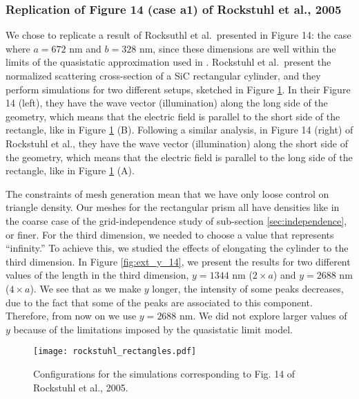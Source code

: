 \subsubsection{Replication of Figure 14 (case a1) of Rockstuhl et al., 2005}

We chose to replicate a result of Rocksuthl et al.\ presented in Figure 14: 
the case where $a=672$ nm 
and $b=328$ nm, since these dimensions are well within the limits of the quasistatic approximation 
used in \pygbe. Rockstuhl et al.\ present the normalized scattering cross-section of a SiC rectangular 
cylinder, and they perform simulations for two different setups, sketched in Figure \ref{fig:rectangle_sketch}. In 
their Figure 14 (left), they have the wave vector (illumination) along the long 
side of the geometry, which means that the electric field is parallel to the short side of the rectangle, like in 
Figure \ref{fig:rectangle_sketch} (B). Following a similar analysis, in Figure 14 (right) of Rockstuhl et al., they have the wave 
vector (illumination) along the short side of the geometry, which means that the electric field is parallel to the 
long side of the rectangle, like in Figure \ref{fig:rectangle_sketch} (A). 

The constraints of mesh generation mean that we have only loose control on triangle density. Our meshes for the rectangular prism all have densities like in the coarse case of the grid-independence study of sub-section \ref{sec:independence}, or finer.
For the third dimension, we needed to choose a value that represents ``infinity.'' To achieve this, we studied the effects of 
elongating the cylinder to the third dimension. In Figure \ref{fig:ext_y_14}, we present the results for two different
values of the length in the third dimension, $y=1344$ nm ($2\times a$) and $y=2688$ nm ($4\times a$). We see that as we make $y$ longer, the 
intensity of some peaks decreases, due to the fact that some of the peaks are associated to this component. Therefore, 
from now on we use $y=2688$ nm. We did not explore larger values of $y$ because of the limitations imposed by the quasistatic limit model.


\begin{figure}
    \centering
    \texttt{[image: rockstuhl\_rectangles.pdf]} 
    \caption{Configurations for the simulations corresponding to Fig. 14 of Rockstuhl et al., 2005.}
    \label{fig:rectangle_sketch}
\end{figure}

